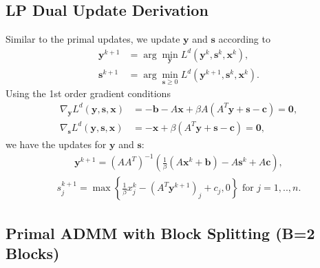 \documentclass{article}
\begin{document}
\subsection*{LP Dual Update Derivation}
Similar to the primal updates, we update $\mathbf{y}$ and $\mathbf{s}$ according to 
\begin{align}
\mathbf{y}^{k+1} & = \arg \min_{\mathbf{y}} L^{d}(\mathbf{y}^{k},\mathbf{s}^k, \mathbf{x}^{k}),\\
\mathbf{s}^{k+1} & = \arg \min_{\mathbf{s} \geq 0} L^{d}(\mathbf{y}^{k+1},\mathbf{s}^k,\mathbf{x}^{k}).
\end{align}
Using the 1st order gradient conditions
\begin{align}
\nabla_{\mathbf{y}}L^{d}(\mathbf{y},\mathbf{s},\mathbf{x}) & =  -\mathbf{b}-A\mathbf{x}+\beta A\left(A^{T}\mathbf{y}+\mathbf{s}-\mathbf{c}\right)  = \mathbf{0}, \label{eq:dual_y} \\
\nabla_{\mathbf{s}}L^{d}(\mathbf{y},\mathbf{s},\mathbf{x}) & =  -\mathbf{x}+\beta\left(A^{T}\mathbf{y}+\mathbf{s}-\mathbf{c}\right) =  \mathbf{0},
\end{align}
we have the updates for $\mathbf{y}$ and $\mathbf{s}$:
\begin{align}\label{eq:y_dual_update}
\mathbf{y}^{k+1} = \left(AA^{T}\right)^{-1}\left(\frac{1}{\beta}\left(A\mathbf{x}^{k}+\mathbf{b}\right)-A\mathbf{s}^{k}+A\mathbf{c}\right),
\end{align}
\begin{align}\label{eq:s_dual_update}
s_j^{k+1} = \max\left\{ \frac{1}{\beta}{x}_j^k-(A^{T}\mathbf{y}^{k+1})_j+{c}_j,0\right\}  \text{ for $j = 1,..,n$}.
\end{align}

\subsection*{Primal ADMM with Block Splitting (B=2 Blocks)}
\end{document}
